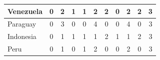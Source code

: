 \documentclass[12pt]{article}  %
\begin{document}
\begin{subappendices}
\begin{longtable}{|l|c|c|c|c|c|c|c|c|c|c|}
	\hline
	Venezuela                                                      & 0                                                                      & 2                                                                      & 1                                                                      & 1                                                                      & 2                                                                      & 2                                                                      & 0                         & 2                           & 2                           & 3                           \\ 
	\hline
	Paraguay                                                       & 0                                                                      & 3                                                                      & 0                                                                      & 0                                                                      & 4                                                                      & 0                                                                      & 0                         & 4                           & 0                           & 3                           \\ 
	\hline
	Indonesia                                                      & 0                                                                      & 1                                                                      & 1                                                                      & 1                                                                      & 1                                                                      & 2                                                                      & 1                         & 1                           & 2                           & 3                           \\ 
	\hline
	Peru                                                           & 0                                                                      & 1                                                                      & 0                                                                      & 1                                                                      & 2                                                                      & 0                                                                      & 0                         & 2                           & 0                           & 3                           \\ 

\end{longtable}
\end{subappendices}
\end{document}
